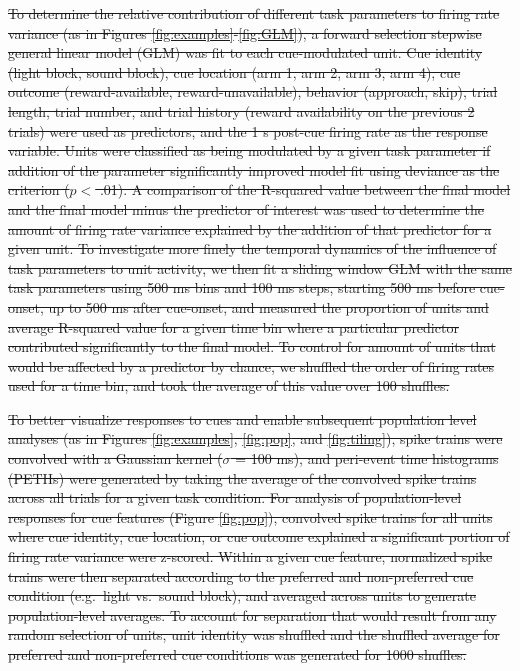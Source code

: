 \documentclass[11pt]{article}
\providecommand{\DIFdel}[1]{{\protect\color{red}\sout{#1}}}                      %
\begin{document}
\DIFdel{To determine the relative contribution of different task parameters to
firing rate variance (as in Figures \ref{fig:examples}-\ref{fig:GLM}),
a forward selection stepwise general linear model (GLM) was fit to
each cue-modulated unit. Cue identity (light block, sound block), cue
location (arm 1, arm 2, arm 3, arm 4), cue outcome (reward-available,
reward-unavailable), behavior (approach, skip), trial length, trial
number, and trial history (reward availability on the previous 2
trials) were used as predictors, and the 1 s post-cue firing rate as
the response variable. Units were classified as being modulated by a
given task parameter if addition of the parameter significantly
improved model fit using deviance as the criterion ($p <$ .01). A
comparison of the R-squared value between the final model and the
final model minus the predictor of interest was used to determine the
amount of firing rate variance explained by the addition of that
predictor for a given unit. To investigate more finely the temporal dynamics of the influence of task parameters to unit activity, we then fit a sliding window GLM with the
same task parameters using 500 ms bins and 100 ms steps, starting 500 ms before cue-onset, up to 500 ms after cue-onset, and measured the proportion of units and average R-squared value for a given time bin
where a particular predictor contributed significantly to the final model. To control for amount of units that would be affected by a predictor by chance, we shuffled the order of firing rates used for a time bin, and took the average of this value over 100 shuffles.
}%

\DIFdel{To better visualize responses to cues and enable subsequent population
level analyses (as in Figures \ref{fig:examples}, \ref{fig:pop}, and
\ref{fig:tiling}), spike trains were convolved with a Gaussian kernel
($\sigma$ = 100 ms), and peri-event time histograms (PETHs) were
generated by taking the average of the convolved spike trains across all
trials for a given task condition. For analysis of population-level
responses for cue features (Figure \ref{fig:pop}), convolved spike
trains for all units where cue identity, cue location, or cue outcome
explained a significant portion of firing rate variance were
z-scored. Within a given cue feature, normalized spike trains were
then separated according to the preferred and non-preferred cue
condition (e.g.\ light vs.\ sound block), and averaged across units to
generate population-level averages. To account for separation that
would result from any random selection of units, unit identity was
shuffled and the shuffled average for preferred and non-preferred cue
conditions was generated for 1000 shuffles.
}%
\end{document}
